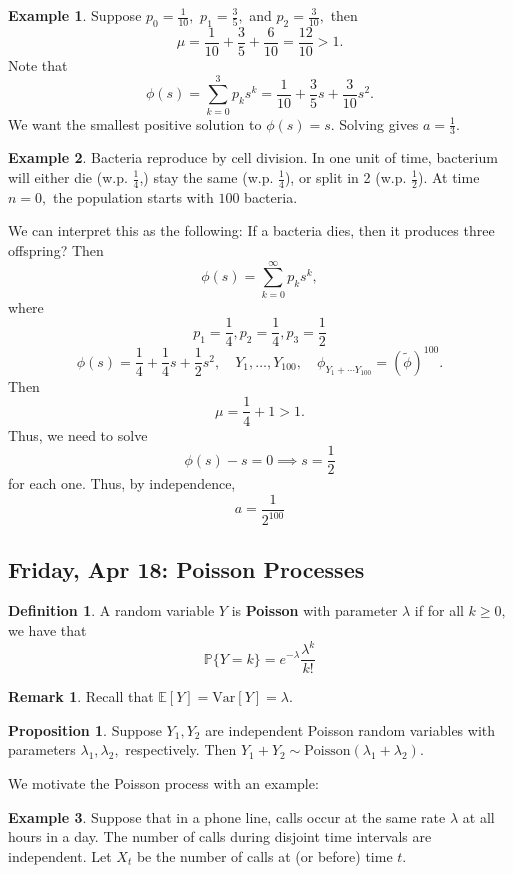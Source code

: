 \documentclass[10pt, oneside]{article}
\newcommand{\bbP}{\mathbb{P}}
\newcommand{\bbE}{\mathbb{E}}
\newcommand{\Var}{\text{Var}}
\theoremstyle{definition}
\newtheorem{exmp}{Example}[section]
\newtheorem{defn}{Definition}
\newtheorem{prop}{Proposition}
\newtheorem{rem}{Remark}
\begin{document}
\begin{exmp}
    Suppose $p_0 = \frac{1}{10},$ $p_1 = \frac{3}{5},$ and $p_2 = \frac{3}{10},$ then 
    \[\mu = \frac{1}{10} + \frac{3}{5} + \frac{6}{10} = \frac{12}{10} >1.\] Note that 
    \[\phi(s) = \sum_{k=0}^3 p_ks^k = \frac{1}{10} + \frac{3}{5}s + \frac{3}{10}s^2.\] We want the smallest positive solution to $\phi(s) = s.$ Solving gives $ a = \frac{1}{3}. $
\end{exmp}

\begin{exmp}
    Bacteria reproduce by cell division. In one unit of time, bacterium will either die (w.p. $\frac{1}{4}$,) stay the same (w.p. $\frac{1}{4}$), or split in 2 (w.p. $\frac{1}{2}$). At time $n = 0,$ the population starts with $100$ bacteria. 

    We can interpret this as the following: If a bacteria dies, then it produces three offspring?
    Then 
    \[\phi(s) = \sum_{k = 0}^\infty p_k s^k,\] where 
    \[p_1 = \frac{1}{4}, p_2  = \frac{1}{4}, p_3 = \frac{1}{2}\]
    \[\phi(s)= \frac{1}{4} + \frac{1}{4}s + \frac{1}{2} s^2, \quad Y_1, \dots, Y_{100}, \quad \phi_{Y_1 + \cdots Y_{100}} = (\tilde{\phi})^{100}.\] Then 
    \[\mu = \frac{1}{4} + 1 >1.\] Thus, we need to solve 
    \[\phi(s) - s = 0 \implies s = \frac{1}{2}\] for each one. Thus, by independence,
    \[ a = \frac{1}{2^{100}}\]
\end{exmp}
\newpage

\subsection{Friday, Apr 18: Poisson Processes}

\begin{defn}
    A random variable $Y$ is \textbf{Poisson} with parameter $\lambda$ if for all $k\geq 0,$ we have that 
    \[\bbP\{Y  = k\} = e^{-\lambda}\frac{\lambda^k}{k!}\]
\end{defn}
\begin{rem}
    Recall that $\bbE[Y] = \Var[Y] = \lambda.$ 
\end{rem}
\begin{prop}
    Suppose $Y_1,Y_2$ are independent Poisson random variables with parameters $\lambda_1, \lambda_2,$ respectively. Then $Y_1 + Y_2 \sim \text{Poisson}(\lambda_1 + \lambda_2).$
\end{prop}

We motivate the Poisson process with an example:
\begin{exmp}
    Suppose that in a phone line, calls occur at the same rate $\lambda$ at all hours in a day. The number of calls during disjoint time intervals are independent. Let $X_t$ be the number of calls at (or before) time $t.$  
\end{exmp}
\end{document}
